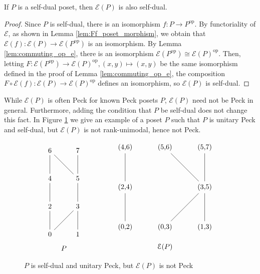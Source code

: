 \documentclass[smallextended, envcountsame, numbook]{svjour3}
\numberwithin{equation}{section}
\newcommand\op{\operatorname{op}}
\begin{document}
\begin{proposition}
\label{prop:self_dual_preservation}
If $P$ is a self-dual poset, then $\mathcal E(P)$ is also self-dual.
\end{proposition}
\begin{proof}
Since $P$ is self-dual, there is an isomorphism $f\colon P \rightarrow P^{\op}$. By functoriality of $\mathcal E$, as shown in Lemma \ref{lem:Ff_poset_morphism}, we obtain that $\mathcal E(f)\colon\mathcal E(P) \rightarrow \mathcal E(P^{\op})$ is an isomorphism. By Lemma \ref{lem:commuting_op_e}, there is an isomorphism $\mathcal E(P^{\op}) \cong \mathcal E(P)^{\op}$. Then, letting $F\colon\mathcal E(P^{\op}) \rightarrow \mathcal E(P)^{\op},(x,y) \mapsto (x,y)$ be the same isomorphism defined in the proof of Lemma \ref{lem:commuting_op_e}, the composition $F\circ \mathcal E(f)\colon\mathcal E(P) \rightarrow \mathcal E(P)^{\op}$ defines an isomorphism, so $\mathcal E(P)$ is self-dual.
\end{proof}

\begin{example}
While $\mathcal{E}(P)$ is often Peck for known Peck posets $P$, $\mathcal E(P)$ need not be Peck in general.  Furthermore, adding the condition that $P$ be self-dual does not change this fact.  In Figure \ref{fig:dual_not_unimodal} we give an example of a poset $P$ such that $P$ is unitary Peck and self-dual, but $\mathcal{E}(P)$ is not rank-unimodal, hence not Peck.
\end{example}

\begin{figure}[h]
\label{fig:dual_not_unimodal}
\[
\begin{tikzpicture}[scale = .7]
  \node (0) at (0,0) {0};
  \node (1) at (2,0) {1};
  \node (2) at (0,2) {2};
  \node (3) at (2,2) {3};
  \node (4) at (0,4) {4};
  \node (5) at (2,4) {5};
  \node (6) at (0,6) {6};
  \node (7) at (2,6) {7};
  \draw (0)--(2);
  \draw (0)--(3);
  \draw (1)--(3);
  \draw (2)--(4);
  \draw (3)--(5);
  \draw (4)--(6);
  \draw (5)--(6);
  \draw (5)--(7);
  \node (8) at (1,-1) {$P$};
\end{tikzpicture}\qquad \hspace{10mm}
\begin{tikzpicture}
  \node (02) at (0,0) {(0,2)};
  \node (03) at (2,0) {(0,3)};
  \node (13) at (4,0) {(1,3)};
  \node (24) at (0,2) {(2,4)};
  \node (35) at (4,2) {(3,5)};
  \node (46) at (0,4) {(4,6)};
  \node (56) at (2,4) {(5,6)};
  \node (57) at (4,4) {(5,7)};
  \draw (02)--(24);
  \draw (03)--(35);
  \draw (13)--(35);
  \draw (24)--(46);
  \draw (35)--(56);
  \draw (35)--(57);
  \node (0) at (2,-1) {$\mathcal{E}(P)$};
\end{tikzpicture}\]
\caption{$P$ is self-dual and unitary Peck, but $\mathcal{E}(P)$ is not Peck}
\end{figure}
\end{document}
